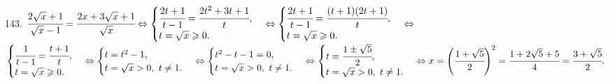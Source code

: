 143. $\cfrac{2\sqrt{x}+1}{\sqrt{x}-1}=\cfrac{2x+3\sqrt{x}+1}{\sqrt{x}}\Leftrightarrow
\begin{cases}\cfrac{2t+1}{t-1}=\cfrac{2t^2+3t+1}{t},\\ t=\sqrt{x}\geqslant0.\end{cases}\Leftrightarrow
\begin{cases}\cfrac{2t+1}{t-1}=\cfrac{(t+1)(2t+1)}{t},\\ t=\sqrt{x}\geqslant0.\end{cases}\Leftrightarrow$\\$
\begin{cases}\cfrac{1}{t-1}=\cfrac{t+1}{t},\\ t=\sqrt{x}\geqslant0.\end{cases}\Leftrightarrow
\begin{cases}t=t^2-1,\\ t=\sqrt{x}>0,\ t\neq1.\end{cases}\Leftrightarrow
\begin{cases}t^2-t-1=0,\\ t=\sqrt{x}>0,\ t\neq1.\end{cases}\Leftrightarrow
\begin{cases}t=\cfrac{1\pm\sqrt{5}}{2},\\ t=\sqrt{x}>0,\ t\neq1.\end{cases}
\Leftrightarrow x=\left(\cfrac{1+\sqrt{5}}{2}\right)^2=
\cfrac{1+2\sqrt{5}+5}{4}=\cfrac{3+\sqrt{5}}{2}.$\\
